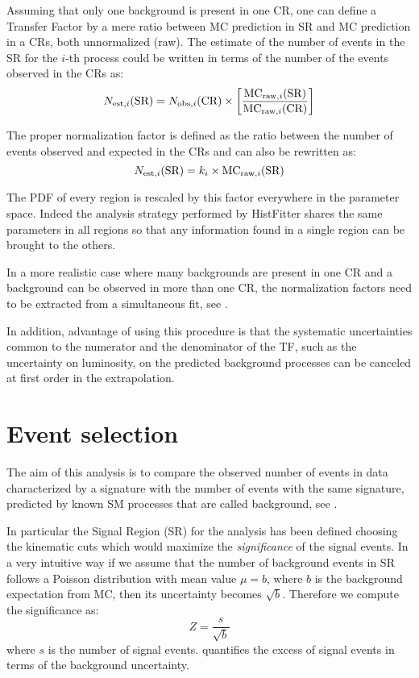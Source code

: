 Assuming that only one background is present in one CR, one can define a Transfer Factor by a mere ratio between MC prediction in SR and MC prediction in a CRs, both unnormalized (raw). The estimate of the number of events in the SR for the $i$-th process could be written in terms of the number of the events observed in the CRs as:
\begin{equation}
  \label{eqn:TF}
  N_{\textup{est},i}(\text{SR}) =  N_{\textup{obs},i}({\text{CR}}) \times \left[\frac{\text{MC}_{\textup{raw},i}(\text{SR})}{\text{MC}_{\textup{raw},i}(\text{CR})} \right]
\end{equation}

The proper normalization factor is defined as the ratio between the number of events observed and expected in the CRs and \Eqn{\ref{eqn:TF}} can also be rewritten as:
\begin{equation}
  N_{\textup{est},i}(\text{SR}) = k_{i}\times\text{MC}_{\textup{raw},i}(\text{SR})
\end{equation}

The PDF of every region is rescaled by this factor everywhere in the parameter space. Indeed the analysis strategy performed by HistFitter shares the same parameters in all regions so that any information found in a single region can be brought to the others.

In a more realistic case where many backgrounds are present in one CR and a background can be observed in more than one CR, the normalization factors need to be extracted from a simultaneous fit, see \Sect{\ref{sec:simfit}}.

In addition, advantage of using this procedure is that the systematic uncertainties common to the numerator and the denominator of the TF, such as the uncertainty on luminosity, on the predicted background processes can be canceled at first order in the extrapolation.

\section{Event selection}
\label{sec:SRselection}
The aim of this analysis is to compare the observed number of events in data characterized by a \mph signature with the number of events with the same signature, predicted by known SM processes that are called background, see \Sect{\ref{sec:bkg}}.

In particular the Signal Region (SR) for the \mph analysis has been defined choosing the kinematic cuts which would maximize the \emph{significance} of the signal events. In a very intuitive way if we assume that the number of background events in SR follows a Poisson distribution with mean value $\mu=b$, where $b$ is the background expectation from MC, then its uncertainty becomes $\sqrt{b}$. Therefore we compute the significance as:
\begin{equation}
  Z=\frac{s}{\sqrt{b}}
  \label{eqn:significance}
\end{equation}
where $s$ is the number of signal events. \Eqn{\ref{eqn:significance}} quantifies the excess of signal events in terms of the background uncertainty. 

